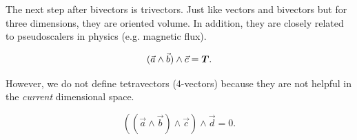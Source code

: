 The next step after bivectors is trivectors. Just like vectors and bivectors but for three dimensions, they are oriented volume. In addition, they are closely related to pseudoscalers in physics (e.g. magnetic flux).

\[
    ( \vec{a} \wedge \vec{b} ) \wedge  \vec{c} = \bm{T}
.\]

However, we do not define tetravectors (4-vectors) because they are not helpful in the \textit{current} dimensional space.

\[
    ( ( \vec{a} \wedge \vec{b} ) \wedge  \vec{c} ) \wedge \vec{d} = 0
.\]






























\newpage
